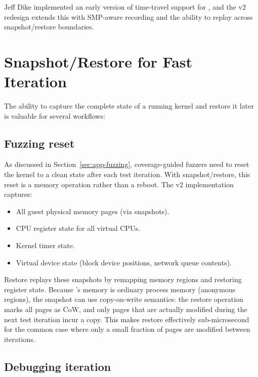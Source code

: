 Jeff Dike implemented an early version of time-travel support for
\UML{}, and the v2 redesign extends this with SMP-aware recording
and the ability to replay across snapshot/restore boundaries.


\section{Snapshot/Restore for Fast Iteration}
\label{sec:app-snapshot}

The ability to capture the complete state of a running kernel and
restore it later is valuable for several workflows:

\subsection{Fuzzing reset}

As discussed in Section~\ref{sec:app-fuzzing}, coverage-guided fuzzers
need to reset the kernel to a clean state after each test iteration.
With snapshot/restore, this reset is a memory operation rather than a
reboot.  The v2 implementation captures:

\begin{itemize}[leftmargin=2em]
  \item All guest physical memory pages (via  snapshots).
  \item CPU register state for all virtual CPUs.
  \item Kernel timer state.
  \item Virtual device state (block device positions, network queue
        contents).
\end{itemize}

Restore replays these snapshots by remapping memory regions and
restoring register state.  Because \UML{}'s memory is ordinary
process memory (anonymous  regions), the snapshot can
use copy-on-write semantics: the restore operation marks all pages
as CoW, and only pages that are actually modified during the next
test iteration incur a copy.  This makes restore effectively
sub-microsecond for the common case where only a small fraction of
pages are modified between iterations.

\subsection{Debugging iteration}


